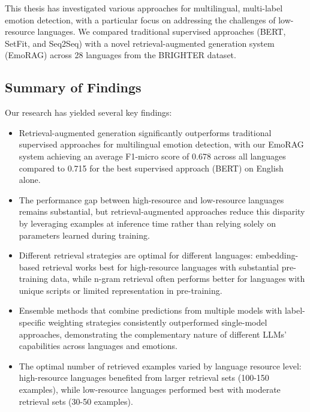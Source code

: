 \documentclass[a4paper,12pt]{extarticle}
\begin{document}
This thesis has investigated various approaches for multilingual, multi-label emotion detection, with a particular focus on addressing the challenges of low-resource languages. We compared traditional supervised approaches (BERT, SetFit, and Seq2Seq) with a novel retrieval-augmented generation system (EmoRAG) across 28 languages from the BRIGHTER dataset.

\subsection{Summary of Findings}

Our research has yielded several key findings:

\begin{itemize}
    \item Retrieval-augmented generation significantly outperforms traditional supervised approaches for multilingual emotion detection, with our EmoRAG system achieving an average F1-micro score of 0.678 across all languages compared to 0.715 for the best supervised approach (BERT) on English alone.
    
    \item The performance gap between high-resource and low-resource languages remains substantial, but retrieval-augmented approaches reduce this disparity by leveraging examples at inference time rather than relying solely on parameters learned during training.
    
    \item Different retrieval strategies are optimal for different languages: embedding-based retrieval works best for high-resource languages with substantial pre-training data, while n-gram retrieval often performs better for languages with unique scripts or limited representation in pre-training.
    
    \item Ensemble methods that combine predictions from multiple models with label-specific weighting strategies consistently outperformed single-model approaches, demonstrating the complementary nature of different LLMs' capabilities across languages and emotions.
    
    \item The optimal number of retrieved examples varied by language resource level: high-resource languages benefited from larger retrieval sets (100-150 examples), while low-resource languages performed best with moderate retrieval sets (30-50 examples).
\end{itemize}
\end{document}
